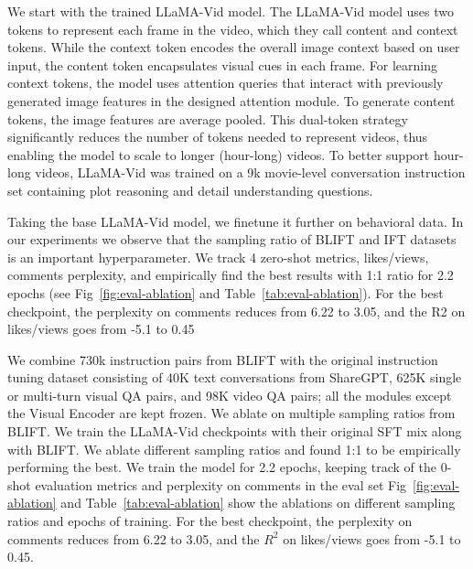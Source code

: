 We start with the trained LLaMA-Vid model. The LLaMA-Vid model uses two tokens to represent each frame in the video, which they call content and context tokens. While the context token encodes the overall image context based on user input, the content token encapsulates visual cues in each frame. For learning context tokens, the model uses attention queries that interact with previously generated image features in the designed attention module. To generate content tokens, the image features are average pooled.
This dual-token strategy significantly reduces the number of tokens needed to represent videos, thus enabling the model to scale to longer (hour-long) videos. To better support hour-long videos, LLaMA-Vid was trained on a 9k movie-level conversation instruction set containing plot reasoning and detail understanding questions. 


Taking the base LLaMA-Vid model, we finetune it further on behavioral data. %
In our experiments we observe that the sampling ratio of BLIFT and IFT datasets is an important hyperparameter. We track 4 zero-shot metrics, likes/views, comments perplexity, and empirically find the best results with 1:1 ratio for 2.2 epochs (see Fig~\ref{fig:eval-ablation} and Table~\ref{tab:eval-ablation}). For the best checkpoint, the perplexity on comments reduces from 6.22 to 3.05, and the R2
on likes/views goes from -5.1 to 0.45

 We combine 730k instruction pairs from BLIFT with the original instruction tuning dataset consisting of 40K text conversations from ShareGPT, 625K single or multi-turn visual QA pairs, and 98K video QA pairs; all the modules except the Visual Encoder are kept frozen. We ablate on multiple sampling ratios from BLIFT. We train the LLaMA-Vid checkpoints with their original SFT mix along with BLIFT. We ablate different sampling ratios and found 1:1 to be empirically performing the best. We train the model for 2.2 epochs, keeping track of the 0-shot evaluation metrics and perplexity on comments in the eval set %
 Fig~\ref{fig:eval-ablation} and Table~\ref{tab:eval-ablation} show the ablations on different sampling ratios and epochs of training. 
For the best checkpoint, the perplexity on comments reduces from 6.22 to 3.05, and the $R^2$ on likes/views goes from -5.1 to 0.45.




